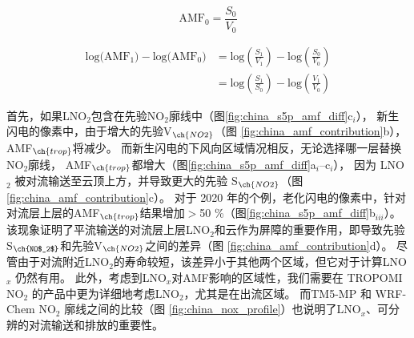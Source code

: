 \begin{equation} \label{eq:AMF0}
\textrm{AMF}_0 = \frac{S_0}{V_0}
\end{equation}


\begin{equation} \label{eq:delta_AMF}
\begin{split}
\textrm{log(AMF$_1$)} - \textrm{log(AMF$_0$)} & = \textrm{log}(\frac{S_1}{V_1}) - \textrm{log}(\frac{S_0}{V_0}) \\
                                              & = \textrm{log}(\frac{S_1}{S_0}) - \textrm{log}(\frac{V_1}{V_0})
\end{split}
\end{equation}


首先，如果LNO$_2$包含在先验NO$_2$廓线中（图\ref{fig:china_s5p_amf_diff}c$_i$），
新生闪电的像素中，由于增大的先验V$_{\ch{NO2}}$（图 \ref{fig:china_amf_contribution}b），AMF$_{\ch{trop}}$将减少。
而新生闪电的下风向区域情况相反，无论选择哪一层替换NO$_2$廓线，
AMF$_{\ch{trop}}$都增大（图\ref{fig:china_s5p_amf_diff}a$_{i}$--c$_{i}$），
因为 LNO $_2$ 被对流输送至云顶上方，并导致更大的先验 S$_{\ch{NO2}}$（图 \ref{fig:china_amf_contribution}c）。
对于 2020 年的个例，老化闪电的像素中，针对对流层上层的AMF$_{\ch{trop}}$结果增加$>$50 \%（图\ref{fig:china_s5p_amf_diff}b$_{iii}$）。
该现象证明了平流输送的对流层上层LNO$_2$和云作为屏障的重要作用，即导致先验S$_{\ch{NO$_2$}}$和先验V$_{\ch{NO2}}$之间的差异（图 \ref{fig:china_amf_contribution}d）。
尽管由于对流附近LNO$_2$的寿命较短，该差异小于其他两个区域，但它对于计算LNO$_x$ 仍然有用。
此外，考虑到LNO$_x$对AMF影响的区域性，我们需要在 TROPOMI NO$_2$ 的产品中更为详细地考虑LNO$_2$，尤其是在出流区域。
而TM5-MP 和 WRF-Chem NO$_2$ 廓线之间的比较（图 \ref{fig:china_nox_profile}）也说明了LNO$_x$、可分辨的对流输送和排放的重要性。



